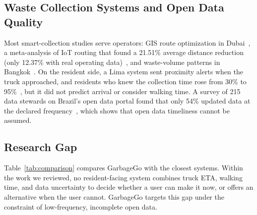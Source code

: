 \subsection{Waste Collection Systems and Open Data Quality}
Most smart-collection studies serve operators: GIS route optimization in
Dubai~\cite{hassan2025dubai}, a meta-analysis of IoT routing that found a
21.51\% average distance reduction (only 12.37\% with real operating
data)~\cite{maciel2025iot}, and waste-volume patterns in
Bangkok~\cite{hamontree2026bangkok}. On the resident side, a Lima system
sent proximity alerts when the truck approached, and residents who knew
the collection time rose from 30\% to 95\%~\cite{duran2026lima}, but it
did not predict arrival or consider walking time. A survey of 215 data
stewards on Brazil's open data portal found that only 54\% updated data
at the declared frequency~\cite{tejedo2025brazil}, which shows that open
data timeliness cannot be assumed.

\subsection{Research Gap}
Table~\ref{tab:comparison} compares GarbageGo with the closest systems.
Within the work we reviewed, no resident-facing system combines truck ETA,
walking time, and data uncertainty to decide whether a user can make it
now, or offers an alternative when the user cannot. GarbageGo targets
this gap under the constraint of low-frequency, incomplete open data.


